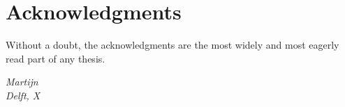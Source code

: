 \chapter*{Acknowledgments}

Without a doubt, the acknowledgments are the most widely and most
eagerly read part of any thesis.

\begin{flushright}
{\makeatletter\itshape
    Martijn \\
    Delft, X
\makeatother}
\end{flushright}


